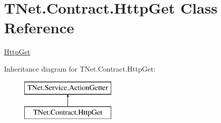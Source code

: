 \hypertarget{class_t_net_1_1_contract_1_1_http_get}{}\section{T\+Net.\+Contract.\+Http\+Get Class Reference}
\label{class_t_net_1_1_contract_1_1_http_get}


\mbox{\hyperlink{class_t_net_1_1_contract_1_1_http_get}{Http\+Get}}  


Inheritance diagram for T\+Net.\+Contract.\+Http\+Get\+:\begin{figure}[H]
\begin{center}
\leavevmode
\includegraphics[height=2.000000cm]{class_t_net_1_1_contract_1_1_http_get}
\end{center}
\end{figure}
